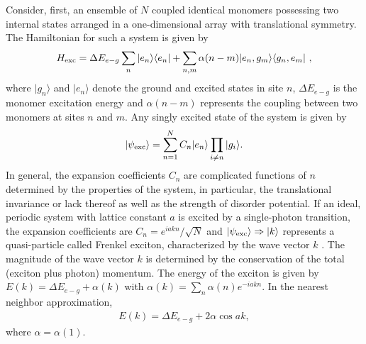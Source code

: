 Consider, first, an ensemble of ${N}$ coupled identical monomers
possessing two internal states arranged in a one-dimensional array
with translational symmetry. The Hamiltonian for such a system is
given by
\begin{equation}
H_{\rm{exc}} = \Delta E_{e-g}\sum_n | e_n \rangle \langle e_n | +
\sum_{n,m} \alpha(n-m) |e_n, g_m\rangle \langle g_n, e_m | \ ,
\label{ham}
\end{equation}
where  $|g_n \rangle$ and $|e_n\rangle$ denote the ground and
excited states in site $n$, $\Delta E_{e-g}$ is the monomer
excitation energy and $\alpha(n-m)$ represents the coupling
between two monomers at sites $n$ and $m$. 
Any singly excited state of the system is given by
%
\begin{eqnarray}
|\psi_{\rm exc}\rangle = \sum_{n=1}^N C_n |e_n\rangle \prod_{i
\neq n} |g_i\rangle . \label{basis}
\end{eqnarray}
%
In general, the expansion coefficients $C_n$ are complicated functions of $n$ determined by the properties of the system, in particular, the translational invariance or lack thereof as well as the strength of disorder potential. 
 If an ideal, periodic system with lattice constant $a$ is excited by a single-photon transition, 
the expansion coefficients are  $C_n =
e^{iakn}/\sqrt{N}$ and  $|\psi_{\rm exc} \rangle \Rightarrow
|k\rangle$ represents a quasi-particle called
Frenkel exciton, characterized by the wave vector $k$
\cite{agranovich}. The magnitude of the wave vector $k$ is determined by the conservation of the total (exciton plus photon) momentum. 
The energy of the exciton is given by $E(k) =
\Delta E_{e-g} + \alpha(k)$ with $\alpha(k) =\sum_n \alpha(n)
e^{-i  a k n}$. In the nearest neighbor approximation,
\begin{eqnarray}
E(k) = \Delta E_{e-g} + 2 \alpha \cos ak, \label{dispersion}
\label{Eexc}
\end{eqnarray}
where $\alpha=\alpha(1)$. 
 
 
 


 
%

